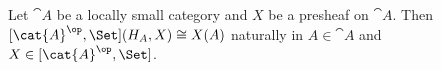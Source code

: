  Let $\cat A$ be a locally small category and $X$ be a presheaf on $\cat A$. Then 
$[\cat{A}^{\op}, \Set](H_A, X) \cong X(A)$
naturally in $A \in \cat A$ and $X \in [\cat{A}^{\op},\Set]$.
